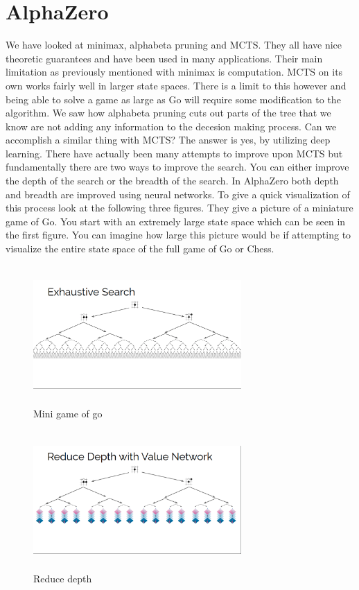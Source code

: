 \section{AlphaZero}
   
   We have looked at minimax, alphabeta pruning and MCTS. They all have nice theoretic guarantees and have been used in many applications. Their main limitation as previously mentioned with minimax is computation. MCTS on its own works fairly well in larger state spaces. There is a limit to this however and being able to solve a game as large as Go will require some modification to the algorithm. We saw how alphabeta pruning cuts out parts of the tree that we know are not adding any information to the decesion making process. Can we accomplish a similar thing with MCTS? The answer is yes, by utilizing deep learning. There have actually been many attempts to improve upon MCTS but fundamentally there are two ways to improve the search. You can either improve the depth of the search or the breadth of the search. In AlphaZero both depth and breadth are improved using neural networks. To give a quick visualization of this process look at the following three figures. They give a picture of a miniature game of Go. You start with an extremely large state space which can be seen in the first figure. You can imagine how large this picture would be if attempting to visualize the entire state space of the full game of Go or Chess. 
   
   \begin{figure}[h!]
       \centering
       \includegraphics[width=300px,height=200px]{images/julian_exhaustive_search.png}
       \caption{Mini game of go}
       \label{fig:my_label}
   \end{figure}

    \begin{figure}[h!]
       \centering
       \includegraphics[width=300px,height=200px]{images/julian_reduce_value_network.png}
       \caption{Reduce depth}
       \label{fig:my_label}
   \end{figure}

